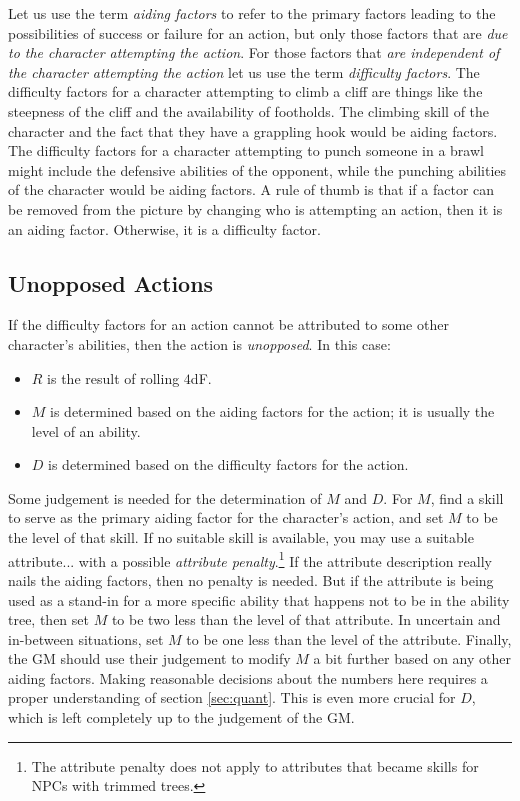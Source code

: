 \documentclass[12pt]{article}
\newcommand{\emdex}[1]{\emph{#1}\index{#1}}
\begin{document}
Let us use the term \emdex{aiding factors} to refer to
the primary factors leading to the possibilities of success or failure for an action,
but only those factors that are \emph{due to the character attempting the action}.
For those factors that \emph{are independent of the character attempting the action} let us use the term \emdex{difficulty factors}.
The difficulty factors for a character attempting to climb a cliff are things
like the steepness of the cliff and the availability of footholds.
The climbing skill of the character and the fact that they have a grappling hook would be aiding factors.
The difficulty factors for a character attempting to punch someone in a brawl might include the defensive abilities of the opponent,
while the punching abilities of the character would be aiding factors.
A rule of thumb is that if a factor can be removed from the picture by changing who is attempting an action,
then it is an aiding factor. Otherwise, it is a difficulty factor.

\subsection{Unopposed Actions}\label{sec:unopposed}
If the difficulty factors for an action cannot be attributed to some other character's abilities,
then the action is \emph{unopposed}.
In this case:
\vspace{-1em}
\begin{itemize}
\item $R$ is the result of rolling $4$dF.
\item $M$ is determined based on the aiding factors for the action; it is usually the level of an ability.
\item $D$ is determined based on the difficulty factors for the action.
\end{itemize}
Some judgement is needed for the determination of $M$ and $D$. For $M$,
find a skill to serve as the primary aiding factor for the character's action,
and set $M$ to be the level of that skill.
If no suitable skill is available, you may use a suitable attribute...
with a possible \emdex{attribute penalty}.\footnote{
The attribute penalty does not apply to attributes that became skills for NPCs with trimmed trees.}
If the attribute description really nails the aiding factors, then no penalty is needed.
But if the attribute is being used as a stand-in for a more specific ability that happens not to be in the ability tree,
then set $M$ to be two less than the level of that attribute.
In uncertain and in-between situations, set $M$ to be one less than the level of the attribute.
Finally, the GM should use their judgement to modify $M$ a bit further based on any other aiding factors.
Making reasonable decisions about the numbers here requires a proper understanding of section \ref{sec:quant}.
This is even more crucial for $D$, which is left completely up to the judgement of the GM.
\end{document}
